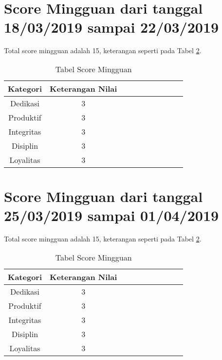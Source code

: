 \section{Score Mingguan dari tanggal 18/03/2019 sampai 22/03/2019}
Total score mingguan adalah 15,  keterangan seperti pada Tabel \ref{table:scoremingguan}.
\begin{table}[!ht]
\centering
\begin{tabular}{ |c|c|c|c|c|c|c|c|c|c| }
\hline
Kategori & Keterangan Nilai \\
\hline
Dedikasi & 3 \\
\hline
Produktif & 3 \\
\hline
Integritas & 3 \\
\hline
Disiplin & 3 \\
\hline
Loyalitas & 3 \\
\hline
\end{tabular}
\caption{Tabel Score Mingguan}
\label{table:scoremingguan}
\end{table}



\section{Score Mingguan dari tanggal 25/03/2019 sampai 01/04/2019}
Total score mingguan adalah 15,  keterangan seperti pada Tabel \ref{table:scoremingguan}.
\begin{table}[!ht]
\centering
\begin{tabular}{ |c|c|c|c|c|c|c|c|c|c| }
\hline
Kategori & Keterangan Nilai \\
\hline
Dedikasi & 3 \\
\hline
Produktif & 3 \\
\hline
Integritas & 3 \\
\hline
Disiplin & 3 \\
\hline
Loyalitas & 3 \\
\hline
\end{tabular}
\caption{Tabel Score Mingguan}
\label{table:scoremingguan}
\end{table}

